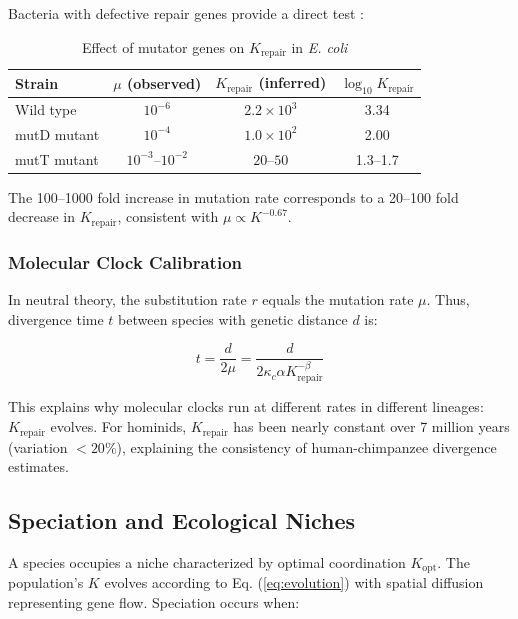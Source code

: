 \documentclass[12pt,a4paper]{article}
\theoremstyle{remark}
\newcommand{\Keffopt}{K_{\mathrm{opt}}}
\newcommand{\kappac}{\kappa_c}
\begin{document}
	Bacteria with defective repair genes provide a direct test \cite{Drake1991}:
	
	\begin{table}[htbp]
		\centering
		\caption{Effect of mutator genes on $K_{\text{repair}}$ in \textit{E. coli} \cite{Drake1991}}
		\label{tab:mutators}
		\small
		\begin{tabular}{lccc}
			\toprule
			\textbf{Strain} & $\mu$ (observed) & $K_{\text{repair}}$ (inferred) & $\log_{10} K_{\text{repair}}$ \\
			\midrule
			Wild type & $10^{-6}$ & $2.2 \times 10^3$ & 3.34 \\
			mutD mutant & $10^{-4}$ & $1.0 \times 10^2$ & 2.00 \\
			mutT mutant & $10^{-3}$--$10^{-2}$ & $20$--$50$ & 1.3--1.7 \\
			\bottomrule
		\end{tabular}
	\end{table}
	
	The 100--1000 fold increase in mutation rate corresponds to a 20--100 fold decrease in $K_{\text{repair}}$, consistent with $\mu \propto K^{-0.67}$.
	
	\subsubsection{Molecular Clock Calibration}
	
	In neutral theory, the substitution rate $r$ equals the mutation rate $\mu$. Thus, divergence time $t$ between species with genetic distance $d$ is:
	
	\begin{equation}
		t = \frac{d}{2\mu} = \frac{d}{2\kappac \alpha K_{\text{repair}}^{-\beta}}
		\label{eq:molecular-clock}
	\end{equation}
	
	This explains why molecular clocks run at different rates in different lineages: $K_{\text{repair}}$ evolves. For hominids, $K_{\text{repair}}$ has been nearly constant over 7 million years (variation $<20\%$), explaining the consistency of human-chimpanzee divergence estimates.
	
	\subsection{Speciation and Ecological Niches}
	
	A species occupies a niche characterized by optimal coordination $\Keffopt$. The population's $K$ evolves according to Eq. (\ref{eq:evolution}) with spatial diffusion representing gene flow. Speciation occurs when:
	
\end{document}

